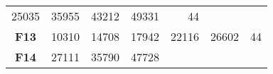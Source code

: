 \documentclass[12pt,a4paper]{article}
\begin{document}
\begin{longtable}[c]{@{}crrrrrr@{}}
\begin{minipage}[t]{0.08\columnwidth}
25035
\strut\end{minipage} &
\begin{minipage}[t]{0.09\columnwidth}\raggedleft\strut
35955
\strut\end{minipage} &
\begin{minipage}[t]{0.10\columnwidth}\raggedleft\strut
43212
\strut\end{minipage} &
\begin{minipage}[t]{0.11\columnwidth}\raggedleft\strut
49331
\strut\end{minipage} &
\begin{minipage}[t]{0.07\columnwidth}\raggedleft\strut
44
\strut\end{minipage}\tabularnewline
\begin{minipage}[t]{0.11\columnwidth}\centering\strut
\textbf{F13}
\strut\end{minipage} &
\begin{minipage}[t]{0.08\columnwidth}\raggedleft\strut
10310
\strut\end{minipage} &
\begin{minipage}[t]{0.08\columnwidth}\raggedleft\strut
14708
\strut\end{minipage} &
\begin{minipage}[t]{0.09\columnwidth}\raggedleft\strut
17942
\strut\end{minipage} &
\begin{minipage}[t]{0.10\columnwidth}\raggedleft\strut
22116
\strut\end{minipage} &
\begin{minipage}[t]{0.11\columnwidth}\raggedleft\strut
26602
\strut\end{minipage} &
\begin{minipage}[t]{0.07\columnwidth}\raggedleft\strut
44
\strut\end{minipage}\tabularnewline
\begin{minipage}[t]{0.11\columnwidth}\centering\strut
\textbf{F14}
\strut\end{minipage} &
\begin{minipage}[t]{0.08\columnwidth}\raggedleft\strut
27111
\strut\end{minipage} &
\begin{minipage}[t]{0.08\columnwidth}\raggedleft\strut
35790
\strut\end{minipage} &
\begin{minipage}[t]{0.09\columnwidth}\raggedleft\strut
47728
\strut\end{minipage} &
\begin{minipage}[t]{0.10\columnwidth}\raggedleft\strut

\end{minipage}
\end{longtable}
\end{document}
